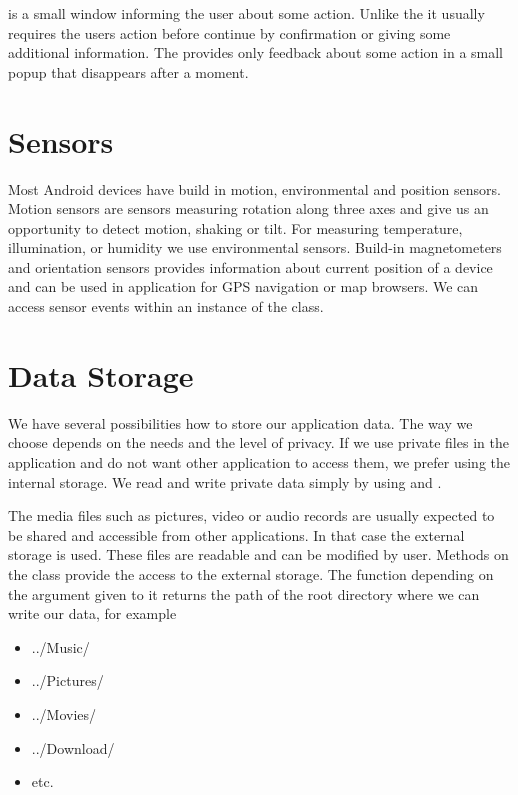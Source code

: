  is a small window informing the user about some action. 
Unlike the  it usually requires the users action before continue by confirmation or giving some additional information.
The  provides only feedback about some action in a small popup that disappears after a moment.


\section{Sensors}

Most Android devices have build in motion, environmental and position sensors.
Motion sensors are sensors measuring rotation along three axes and give us an opportunity to detect motion, shaking or tilt.
For measuring temperature, illumination, or humidity we use environmental sensors.
Build-in magnetometers and orientation sensors provides information about current position of a device and can be used in application for GPS navigation or map browsers.
We can access sensor events within an instance of  the  class.

\section{Data Storage}

We have several possibilities how to store our application data.
The way we choose depends on the needs and the level of privacy.
If we use private files in the application and do not want other application to access them, we prefer using the internal storage.
We read and write private data simply by using  and .

The media files such as pictures, video or audio records are usually expected to be shared and accessible from other applications.
In that case the external storage is used.
These files are readable and can be modified by user.
Methods on the  class provide the access to the external storage.
The function  depending on the argument given to it returns the path of the root directory where we can write our data, for example

\begin{itemize}
\item{../Music/}
\item{../Pictures/}
\item{../Movies/}
\item{../Download/}
\item{etc.}
\end{itemize}

